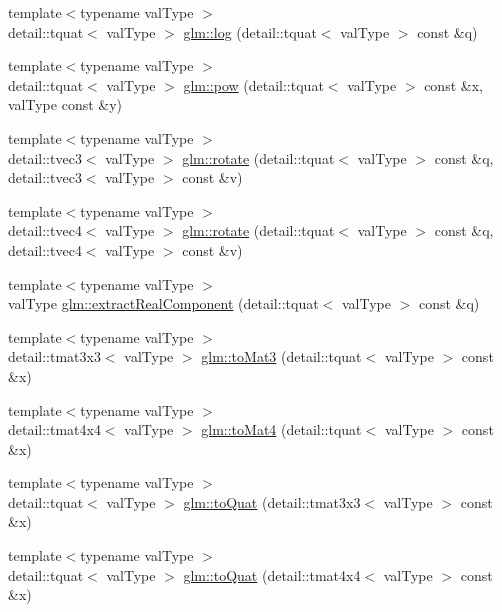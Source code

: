 \begin{DoxyCompactItemize}
\item 
{\footnotesize template$<$typename val\+Type $>$ }\\detail\+::tquat$<$ val\+Type $>$ \hyperlink{group__gtx__quaternion_ga68d8d03cc87b3980abec4d80534f3d8e}{glm\+::log} (detail\+::tquat$<$ val\+Type $>$ const \&q)
\item 
{\footnotesize template$<$typename val\+Type $>$ }\\detail\+::tquat$<$ val\+Type $>$ \hyperlink{group__gtx__quaternion_ga7765f7d8a3399af25f8bc7956a77c7b2}{glm\+::pow} (detail\+::tquat$<$ val\+Type $>$ const \&x, val\+Type const \&y)
\item 
{\footnotesize template$<$typename val\+Type $>$ }\\detail\+::tvec3$<$ val\+Type $>$ \hyperlink{group__gtx__quaternion_gad1ada3be83514169fed6054b4e68b5ca}{glm\+::rotate} (detail\+::tquat$<$ val\+Type $>$ const \&q, detail\+::tvec3$<$ val\+Type $>$ const \&v)
\item 
{\footnotesize template$<$typename val\+Type $>$ }\\detail\+::tvec4$<$ val\+Type $>$ \hyperlink{group__gtx__quaternion_ga765b903facf3c4e325cab32cba75d9be}{glm\+::rotate} (detail\+::tquat$<$ val\+Type $>$ const \&q, detail\+::tvec4$<$ val\+Type $>$ const \&v)
\item 
{\footnotesize template$<$typename val\+Type $>$ }\\val\+Type \hyperlink{group__gtx__quaternion_gaa4574d2111d8c55c0e5c531706c0e20d}{glm\+::extract\+Real\+Component} (detail\+::tquat$<$ val\+Type $>$ const \&q)
\item 
{\footnotesize template$<$typename val\+Type $>$ }\\detail\+::tmat3x3$<$ val\+Type $>$ \hyperlink{group__gtx__quaternion_gaae1a23ba337628402dbe68d6567a9444}{glm\+::to\+Mat3} (detail\+::tquat$<$ val\+Type $>$ const \&x)
\item 
{\footnotesize template$<$typename val\+Type $>$ }\\detail\+::tmat4x4$<$ val\+Type $>$ \hyperlink{group__gtx__quaternion_ga14c3426d79fe82b07cd1f3610a18d9f5}{glm\+::to\+Mat4} (detail\+::tquat$<$ val\+Type $>$ const \&x)
\item 
{\footnotesize template$<$typename val\+Type $>$ }\\detail\+::tquat$<$ val\+Type $>$ \hyperlink{group__gtx__quaternion_ga70cb5b2da64a17632dbf151dcfec0150}{glm\+::to\+Quat} (detail\+::tmat3x3$<$ val\+Type $>$ const \&x)
\item 
{\footnotesize template$<$typename val\+Type $>$ }\\detail\+::tquat$<$ val\+Type $>$ \hyperlink{group__gtx__quaternion_ga25b6237ccb6c4a69d57a181aac99aa43}{glm\+::to\+Quat} (detail\+::tmat4x4$<$ val\+Type $>$ const \&x)

\end{DoxyCompactItemize}
